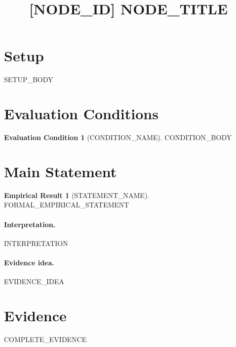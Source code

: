 \documentclass[11pt]{article}
\title{[{{NODE_ID}}] {{NODE_TITLE}}}
\author{}
\date{}
\theoremstyle{definition}
\newtheorem{assumption}{Evaluation Condition}
\newtheorem{empiricalresult}{Empirical Result}
\begin{document}
\maketitle

\section*{Setup}
{{SETUP_BODY}}

\section*{Evaluation Conditions}
\begin{assumption}[{{CONDITION_NAME}}]\label{cond:{{NODE_ID}}-1}
{{CONDITION_BODY}}
\end{assumption}

\section*{Main Statement}
\begin{empiricalresult}[{{STATEMENT_NAME}}]\label{stmt:{{NODE_ID}}}
{{FORMAL_EMPIRICAL_STATEMENT}}
\end{empiricalresult}

\paragraph{Interpretation.}
{{INTERPRETATION}}

\paragraph{Evidence idea.}
{{EVIDENCE_IDEA}}

\section*{Evidence}
{{COMPLETE_EVIDENCE}}

\end{document}
